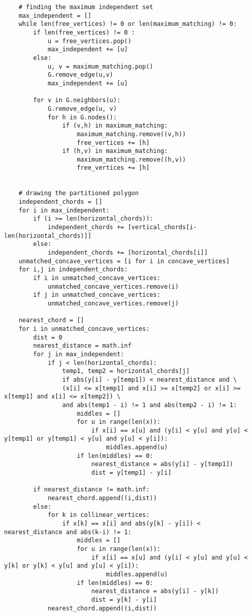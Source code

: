 \begin{lstlisting}
    # finding the maximum independent set
    max_independent = []
    while len(free_vertices) != 0 or len(maximum_matching) != 0:
        if len(free_vertices) != 0 :
            u = free_vertices.pop()
            max_independent += [u]
        else:
            u, v = maximum_matching.pop()
            G.remove_edge(u,v)
            max_independent += [u]

        for v in G.neighbors(u):
            G.remove_edge(u, v)
            for h in G.nodes():
                if (v,h) in maximum_matching:
                    maximum_matching.remove((v,h))
                    free_vertices += [h]
                if (h,v) in maximum_matching:
                    maximum_matching.remove((h,v))
                    free_vertices += [h]

    
    # drawing the partitioned polygon 
    independent_chords = []
    for i in max_independent:
        if (i >= len(horizontal_chords)):
            independent_chords += [vertical_chords[i-len(horizontal_chords)]]
        else:
            independent_chords += [horizontal_chords[i]]
    unmatched_concave_vertices = [i for i in concave_vertices]
    for i,j in independent_chords:
        if i in unmatched_concave_vertices:
            unmatched_concave_vertices.remove(i)
        if j in unmatched_concave_vertices:
            unmatched_concave_vertices.remove(j)
    
    nearest_chord = []
    for i in unmatched_concave_vertices:
        dist = 0
        nearest_distance = math.inf
        for j in max_independent:
            if j < len(horizontal_chords):
                temp1, temp2 = horizontal_chords[j]
                if abs(y[i] - y[temp1]) < nearest_distance and \
                (x[i] <= x[temp1] and x[i] >= x[temp2] or x[i] >= x[temp1] and x[i] <= x[temp2]) \
                and abs(temp1 - i) != 1 and abs(temp2 - i) != 1:
                    middles = []
                    for u in range(len(x)):
                        if x[i] == x[u] and (y[i] < y[u] and y[u] < y[temp1] or y[temp1] < y[u] and y[u] < y[i]):
                            middles.append(u)
                    if len(middles) == 0:
                        nearest_distance = abs(y[i] - y[temp1])
                        dist = y[temp1] - y[i]

        if nearest_distance != math.inf:
            nearest_chord.append((i,dist)) 
        else:
            for k in collinear_vertices:
                if x[k] == x[i] and abs(y[k] - y[i]) < nearest_distance and abs(k-i) != 1:
                    middles = []
                    for u in range(len(x)):
                        if x[i] == x[u] and (y[i] < y[u] and y[u] < y[k] or y[k] < y[u] and y[u] < y[i]):
                            middles.append(u)
                    if len(middles) == 0:
                        nearest_distance = abs(y[i] - y[k])
                        dist = y[k] - y[i]
            nearest_chord.append((i,dist)) 
     

\end{lstlisting}
